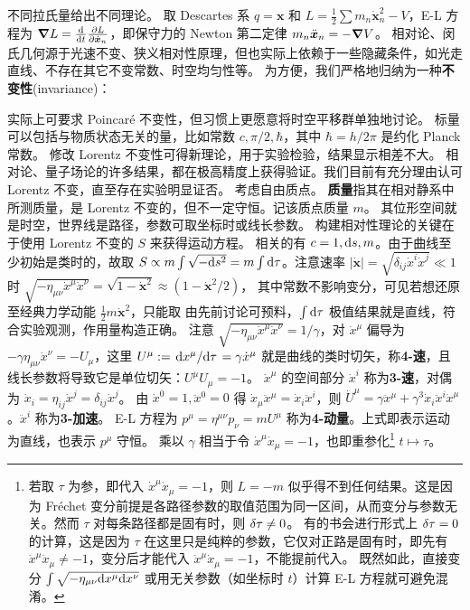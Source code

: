 不同拉氏量给出不同理论。
取 Descartes 系 $q=\bm x$ 和 $L=\frac 12 \sum m_n\dot{\bm x}_n^2 - V$，E-L 方程为 $\grad L=\dv{t}\pdv{L}{\dot{\bm x}_n}$，即保守力的 Newton 第二定律 $m_n\ddot{\bm x}_n=-\grad V$。
相对论、闵氏几何源于光速不变、狭义相对性原理，但也实际上依赖于一些隐藏条件，如光走直线、不存在其它不变常数、时空均匀性等。
为方便，我们严格地归纳为一种\textbf{不变性}(invariance)：
\begin{center}
\end{center}
实际上可要求 Poincaré 不变性，但习惯上更愿意将时空平移群单独地讨论。
标量可以包括与物质状态无关的量，比如常数 $c,\pi/2,\hbar$，其中 $\hbar=h/2\pi$ 是约化 Planck 常数。
修改 Lorentz 不变性可得新理论，用于实验检验，结果显示相差不大。
相对论、量子场论的许多结果，都在极高精度上获得验证。我们目前有充分理由认可 Lorentz 不变，直至存在实验明显证否。
考虑自由质点。
\textbf{质量}指其在相对静系中所测质量，是 Lorentz 不变的，但不一定守恒。记该质点质量 $m$。
其位形空间就是时空，世界线是路径，参数可取坐标时或线长参数。
构建相对性理论的关键在于使用 Lorentz 不变的 $S$ 来获得运动方程。
相关的有 $c=1,\dd s,m$。由于曲线至少初始是类时的，故取 $S\propto m\int \sqrt{-\dd s^2}=m\int\dd\tau$。注意速率 $|\dot{\bm x}|=\sqrt{\delta_{ij}\dot{x}^i \dot{x}^j}\ll 1$ 时 $\sqrt{-\eta_{\mu\nu}\dot x^\mu \dot x^\nu}=\sqrt{1-\dot{\bm x}^2}\approx (1-\dot{\bm x}^2/{2} )$，
其中常数不影响变分，可见若想还原至经典力学动能 $\frac{1}{2}m\dot{\bm x}^2$，只能取
由先前讨论可预料，$\int\dd\tau$ 极值结果就是直线，符合实验观测，作用量构造正确。
注意 $\sqrt{-\eta_{\mu\nu}\dot x^\mu \dot x^\nu}=1/\gamma$，对 $\dot x^\mu$ 偏导为 $-\gamma\eta_{\mu\nu}\dot x^\nu=-U_\mu$，这里 $U^\mu:=\dv*{x^\mu}{\tau}=\gamma\dot x^\mu$ 就是曲线的类时切矢，称\textbf{4-速}，且线长参数将导致它是单位切矢：$U^\mu U_\mu =-1$。
$\dot x^\mu$ 的空间部分 $\dot{x}^i$ 称为\textbf{3-速}，对偶为 $\dot{x}_i=\eta_{ij}\dot{x}^j=\delta_{ij}\dot{x}^j$。
由 $\dot x^0=1,\ddot x^0=0$ 得 $\dot{x}_\mu\ddot{x}^\mu=\dot{x}_i\ddot{x}^i$，则 $\dot U^\mu = \gamma\ddot x^\mu + \gamma^3\dot{x}_i\ddot{x}^i\dot x^\mu$。$\ddot{x}^i$ 称为\textbf{3-加速}。
E-L 方程为
$p^\mu=\eta^{\mu\nu}p_\nu=m U^\mu$ 称为\textbf{4-动量}。上式即表示运动为直线，也表示 $p^\mu$ 守恒。
乘以 $\gamma$ 相当于令 $\dot x^\mu \dot x_\mu=-1$，也即重参化\footnote{
    若取 $\tau$ 为参，即代入 $\dot x^\mu \dot x_\mu=-1$，则 $L=-m$ 似乎得不到任何结果。这是因为 Fréchet 变分前提是各路径参数的取值范围为同一区间，从而变分与参数无关。然而 $\tau$ 对每条路径都是固有时，则 $\var\tau\ne 0$。
    有的书会进行形式上 $\var\tau=0$ 的计算，这是因为 $\tau$ 在这里只是纯粹的参数，它仅对正路是固有时，即先有 $\dot x^\mu \dot x_\mu\ne-1$，变分后才能代入 $\dot x^\mu \dot x_\mu=-1$，不能提前代入。
    既然如此，直接变分 $\int\sqrt{-\eta_{\mu\nu}\dd x^\mu \dd x^\nu}$ 或用无关参数（如坐标时 $t$）计算 E-L 方程就可避免混淆。} $t\mapsto\tau$。
